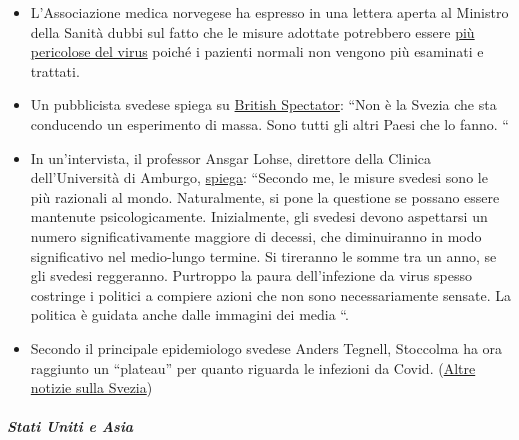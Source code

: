\begin{itemize}
\tightlist
\item
  L'Associazione medica norvegese ha espresso in una lettera aperta al
  Ministro della Sanità dubbi sul fatto che le misure adottate
  potrebbero essere
  \href{https://www.abcnyheter.no/helse-og-livsstil/helse/2020/04/06/195667780/nesten-halvparten-av-sengene-pa-oslo-universitetssykehus-star-tomme}{più
  pericolose del virus} poiché i pazienti normali non vengono più
  esaminati e trattati.
\item
  Un pubblicista svedese spiega su
  \href{https://www.spectator.co.uk/article/no-lockdown-please-w-re-swedish}{British
  Spectator}: ``Non è la Svezia che sta conducendo un esperimento di
  massa. Sono tutti gli altri Paesi che lo fanno. ``
\item
  In un'intervista, il professor Ansgar Lohse, direttore della Clinica
  dell'Università di Amburgo,
  \href{https://www.abendblatt.de/hamburg/article228880917/uke-professor-shutdown-lohse-deutschland-hamburg-corona-virus-infektion-covid-19-impfstoff-coronavirus-krise-patienten-immunitaet-krankenhaeuser-kontaktverbot-kliniken-infektionsrate.html}{spiega}:
  ``Secondo me, le misure svedesi sono le più razionali al mondo.
  Naturalmente, si pone la questione se possano essere mantenute
  psicologicamente. Inizialmente, gli svedesi devono aspettarsi un
  numero significativamente maggiore di decessi, che diminuiranno in
  modo significativo nel medio-lungo termine. Si tireranno le somme tra
  un anno, se gli svedesi reggeranno. Purtroppo la paura dell'infezione
  da virus spesso costringe i politici a compiere azioni che non sono
  necessariamente sensate. La politica è guidata anche dalle immagini
  dei media ``.
\item
  Secondo il principale epidemiologo svedese Anders Tegnell, Stoccolma
  ha ora raggiunto un ``plateau'' per quanto riguarda le infezioni da
  Covid.
  (\href{https://www.thelocal.se/20200310/timeline-how-the-coronavirus-has-developed-in-sweden}{Altre
  notizie sulla Svezia})
\end{itemize}

\hypertarget{stati-uniti-e-asia}{%
\subparagraph{\texorpdfstring{\textbf{Stati Uniti e
Asia}}{Stati Uniti e Asia}}\label{stati-uniti-e-asia}}

